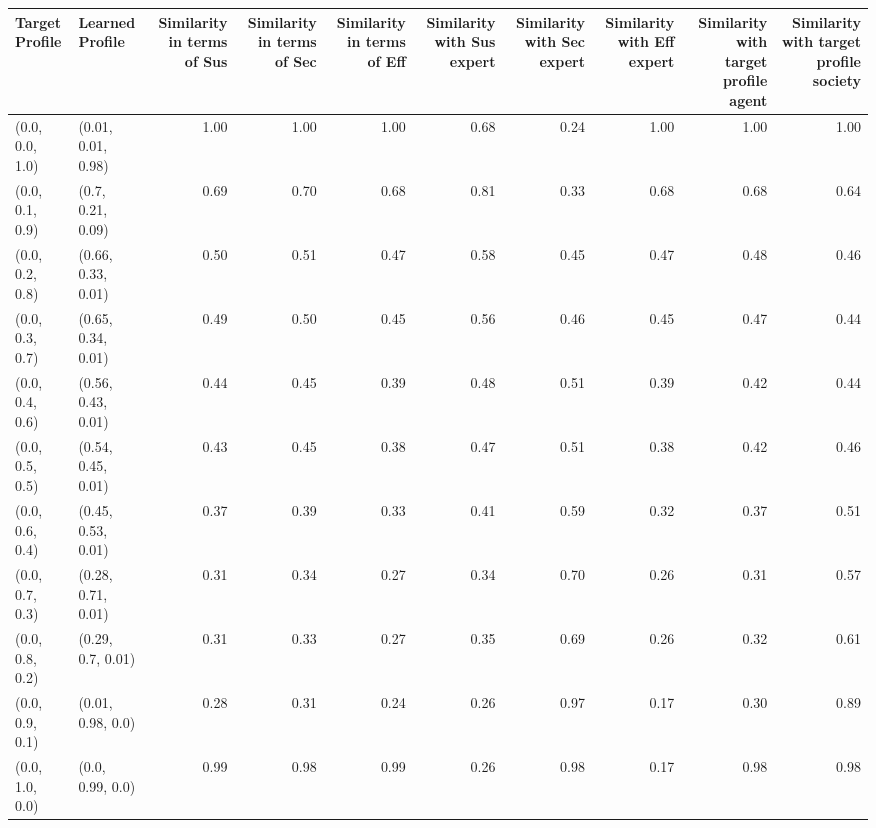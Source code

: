 \begin{tabular}{llrrrrrrrr}
\toprule
Target Profile & Learned Profile & Similarity in terms of Sus & Similarity in terms of Sec & Similarity in terms of Eff & Similarity with Sus expert & Similarity with Sec expert & Similarity with Eff expert & Similarity with target profile agent & Similarity with target profile society \\
\midrule
(0.0, 0.0, 1.0) & (0.01, 0.01, 0.98) & 1.00 & 1.00 & 1.00 & 0.68 & 0.24 & 1.00 & 1.00 & 1.00 \\
(0.0, 0.1, 0.9) & (0.7, 0.21, 0.09) & 0.69 & 0.70 & 0.68 & 0.81 & 0.33 & 0.68 & 0.68 & 0.64 \\
(0.0, 0.2, 0.8) & (0.66, 0.33, 0.01) & 0.50 & 0.51 & 0.47 & 0.58 & 0.45 & 0.47 & 0.48 & 0.46 \\
(0.0, 0.3, 0.7) & (0.65, 0.34, 0.01) & 0.49 & 0.50 & 0.45 & 0.56 & 0.46 & 0.45 & 0.47 & 0.44 \\
(0.0, 0.4, 0.6) & (0.56, 0.43, 0.01) & 0.44 & 0.45 & 0.39 & 0.48 & 0.51 & 0.39 & 0.42 & 0.44 \\
(0.0, 0.5, 0.5) & (0.54, 0.45, 0.01) & 0.43 & 0.45 & 0.38 & 0.47 & 0.51 & 0.38 & 0.42 & 0.46 \\
(0.0, 0.6, 0.4) & (0.45, 0.53, 0.01) & 0.37 & 0.39 & 0.33 & 0.41 & 0.59 & 0.32 & 0.37 & 0.51 \\
(0.0, 0.7, 0.3) & (0.28, 0.71, 0.01) & 0.31 & 0.34 & 0.27 & 0.34 & 0.70 & 0.26 & 0.31 & 0.57 \\
(0.0, 0.8, 0.2) & (0.29, 0.7, 0.01) & 0.31 & 0.33 & 0.27 & 0.35 & 0.69 & 0.26 & 0.32 & 0.61 \\
(0.0, 0.9, 0.1) & (0.01, 0.98, 0.0) & 0.28 & 0.31 & 0.24 & 0.26 & 0.97 & 0.17 & 0.30 & 0.89 \\
(0.0, 1.0, 0.0) & (0.0, 0.99, 0.0) & 0.99 & 0.98 & 0.99 & 0.26 & 0.98 & 0.17 & 0.98 & 0.98 \\
\bottomrule
\end{tabular}
